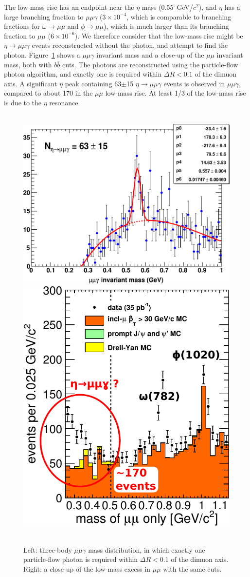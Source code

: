 \documentclass[12pt]{cms-tdr}
\begin{document}
The low-mass rise has an endpoint near the $\eta$ mass
(0.55~GeV/$c^2$), and $\eta$ has a large branching fraction to
$\mu\mu\gamma$ ($3\times 10^{-4}$, which is comparable to branching
fractions for $\omega \to \mu\mu$ and $\phi \to \mu\mu$), which is
much larger than its branching fraction to $\mu\mu$ ($6\times
10^{-6}$).  We therefore consider that the low-mass rise might be
$\eta \to \mu\mu\gamma$ events reconstructed without the photon, and
attempt to find the photon.  Figure~\ref{fig:eta_peak} shows a
$\mu\mu\gamma$ invariant mass and a close-up of the $\mu\mu$ invariant
mass, both with $b\bar{b}$ cuts.  The photons are reconstructed using
the particle-flow photon algorithm, and exactly one is required within
$\Delta R < 0.1$ of the dimuon axis.  A significant $\eta$ peak
containing 63$\pm$15 $\eta \to \mu\mu\gamma$ events is observed in
$\mu\mu\gamma$, compared to about 170 in the $\mu\mu$ low-mass rise.
  At least 1/3 of the low-mass rise is due to the $\eta$
resonance.

\begin{figure}
\mbox{ } \hfill \includegraphics[height=6.4 cm]{PLOTS/eta_peak.pdf} \hfill
\includegraphics[height=6.4 cm]{PLOTS/mass_of_mumu_only.pdf} \hfill \mbox{ }

\caption{Left: three-body $\mu\mu\gamma$ mass distribution, in which
  exactly one particle-flow photon is required within $\Delta R < 0.1$
  of the dimuon axis.  Right: a close-up of the low-mass excess in
  $\mu\mu$ with the same cuts. \label{fig:eta_peak}}
\end{figure}
\end{document}
